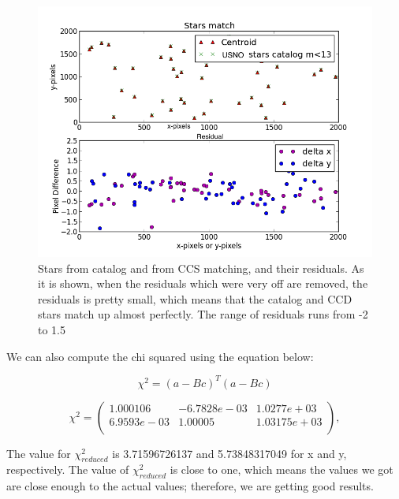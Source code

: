\documentclass[letterpaper,12pt]{article}
\begin{document}
\FloatBarrier
\begin{figure}[h!]
\centering
\includegraphics[scale=0.5]{stars_match_2.png}
\caption{Stars from catalog and from CCS matching, and their residuals. As it is shown, when the residuals which were very off are removed, the residuals is pretty small, which means that the catalog and CCD stars match up almost perfectly. The range of residuals runs from -2 to 1.5}
\end{figure}
\FloatBarrier



We can also compute the chi squared using the equation below:

\begin{equation}
\chi^2 = (a-Bc)^T(a-Bc)
\end{equation}


\begin{equation}
\chi^2= 
\begin{pmatrix}
  1.000106 & -6.7828e-03  & 1.0277e+03 \\
  6.9593e-03  & 1.00005 & 1.03175e+03 \\ 
 \end{pmatrix}, 
\end{equation}

The value for \begin{math} \chi_{reduced}^2 \end{math} is 3.71596726137 and 5.73848317049 for x and y, respectively. The value of \begin{math} \chi_{reduced}^2 \end{math} is close to one, which means the values we got are close enough to the actual values; therefore, we are getting good results.
\end{document}
